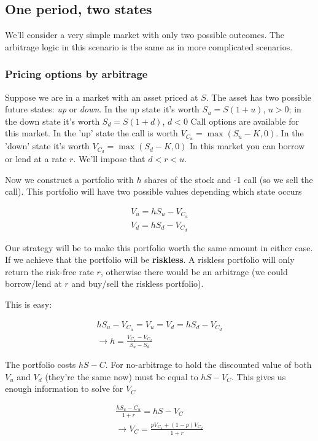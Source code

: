 \subsection{One period, two states}

We'll consider a very simple market with only two possible outcomes. The arbitrage logic in this scenario is the same as in more complicated scenarios. 

\subsubsection{Pricing options by arbitrage}
Suppose we are in a market with an asset priced at $S$. The asset has two possible future states: \textit{up} or \textit{down}. In the up state it's worth $S_u = S(1+u)$, $u>0$; in the down state it's worth $S_d = S(1+d)$, $d<0$ Call options are available for this market. In the 'up' state the call is worth $V_{C_u} = \max(S_u-K,0)$. In the 'down' state it's worth $V_{C_d} = \max(S_d-K,0)$ In this market you can borrow or lend at a rate $r$. We'll impose that $d<r<u$.

Now we construct a portfolio with $h$ shares of the stock and -1 call (so we sell the call). This portfolio will have two possible values depending which state occurs

\begin{eqnarray*}
V_u = hS_u -V_{C_u}\\
V_d = hS_d -V_{C_d}
\end{eqnarray*}

Our strategy will be to make this portfolio worth the same amount in either case. If we achieve that the portfolio will be \textbf{riskless}. A riskless portfolio will only return the risk-free rate $r$, otherwise there would be an arbitrage (we could borrow/lend at $r$ and buy/sell the riskless portfolio).

This is easy:

\begin{eqnarray*}
hS_u -V_{C_u} = V_u = V_d = hS_d - V_{C_d}\\
\rightarrow h = \frac{V_{C_u}-V_{C_d}}{S_u-S_d}
\end{eqnarray*}
 
The portfolio costs $hS-C$. For no-arbitrage to hold the discounted value of both $V_u$ and $V_d$ (they're the same now) must be equal to $hS-V_{C}$. This gives us enough information to solve for $V_{C}$

\begin{eqnarray*}
\frac{hS_u-C_u}{1+r}= hS-V_{C}\\
\rightarrow V_C = \frac{p V_{C_u}  + (1-p) V_{C_d}}{1+r}
\end{eqnarray*}

